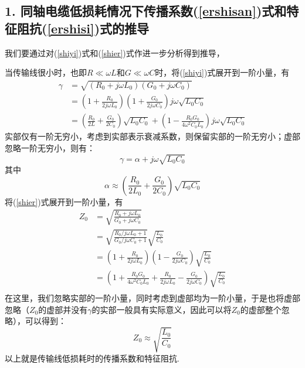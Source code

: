 \documentclass[UTF8]{ctexart}
\begin{document}
\subsection*{1. 同轴电缆低损耗情况下传播系数(\ref{ershisan})式和特征阻抗(\ref{ershisi})式的推导}
我们要通过对(\ref{shiyi})式和(\ref{shier})式作进一步分析得到推导，\par
当传输线很小时，也即$R\ll \omega L$和$G\ll \omega C$时，将(\ref{shiyi})式展开到一阶小量，有
\begin{equation}
    \begin{aligned}
      \gamma&=\sqrt{(R_0+j\omega L_0)(G_0+j\omega C_0)}\\
      &=(1+\frac{R_0}{2j\omega L_0})(1+\frac{G_0}{2j\omega C_0})j\omega\sqrt{L_0C_0}\\
      &=(\frac{R_0}{2L}+\frac{G_0}{2C_0})\sqrt{L_0C_0}+(1-\frac{R_0G_0}{4\omega^2C_0L_0})j\omega\sqrt{L_0C_0}
    \end{aligned}
\end{equation}
实部仅有一阶无穷小，考虑到实部表示衰减系数，则保留实部的一阶无穷小；虚部忽略一阶无穷小，则有：
\begin{equation}
   \gamma=\alpha+j\omega\sqrt{L_0C_0}
\end{equation}
其中\begin{equation}\alpha\approx(\frac{R_0}{2L_0}+\frac{G_0}{2C_0})\sqrt{L_0C_0}\label{alpha}\end{equation}
将(\ref{shier})式展开到一阶小量，有
\begin{equation}
   \begin{aligned}
      Z_0&=\sqrt{\frac{R_0+j\omega L_0}{G_0+j\omega C_0}}\\
         &=\sqrt{\frac{R_0/j\omega L_0+1}{G_0/j\omega C_0+1}}\sqrt{\frac{L_0}{C_0}}\\
         &=(1+\frac{R_0}{2j\omega L_0})(1-\frac{G_0}{2j\omega C_0})\sqrt{\frac{L_0}{C_0}}\\
         &=(1+\frac{R_0G_0}{4\omega^2C_0L_0}+\frac{R_0}{2j\omega L_0}-\frac{G_0}{2j\omega C_0})\sqrt{\frac{L_0}{C_0}}\\
   \end{aligned}
\end{equation}
在这里，我们忽略实部的一阶小量，同时考虑到虚部均为一阶小量，于是也将虚部忽略（$Z_0$的虚部并没有$\gamma$的实部一般具有实际意义，因此可以将$Z_0$的虚部整个忽略），可以得到：
\begin{equation}
    Z_0\approx\sqrt{\frac{L_0}{C_0}}
\end{equation}
以上就是传输线低损耗时的传播系数和特征阻抗.\par
\end{document}
